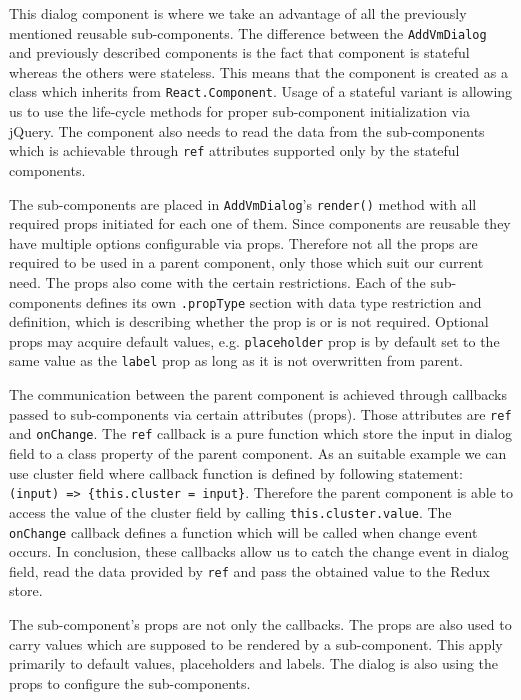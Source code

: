 This dialog component is where we take an advantage of all the previously mentioned reusable sub-components. The difference between the \texttt{AddVmDialog} and previously described components is the fact that component is stateful whereas the others were stateless. This means that the component is created as a class which inherits from \texttt{React.Component}. Usage of a stateful variant is allowing us to use the life-cycle methods for proper sub-component initialization via jQuery. The component also needs to read the data from the sub-components which is achievable through \texttt{ref} attributes supported only by the stateful components.

The sub-components are placed in \texttt{AddVmDialog}'s \texttt{render()} method with all required props initiated for each one of them. Since components are reusable they have multiple options configurable via props. Therefore not all the props are required to be used in a parent component, only those which suit our current need. The props also come with the certain restrictions. Each of the sub-components defines its own \texttt{.propType} section with data type restriction and definition, which is describing whether the prop is or is not required. Optional props may acquire default values, e.g. \texttt{placeholder} prop is by default set to the same value as the \texttt{label} prop as long as it is not overwritten from parent.

The communication between the parent component is achieved through callbacks passed to sub-components via certain attributes (props). Those attributes are \texttt{ref} and \texttt{onChange}. The \texttt{ref} callback is a pure function which store the input in dialog field to a class property of the parent component. As an suitable example we can use cluster field where callback function is defined by following statement: \texttt{(input) => \{this.cluster = input\}}. Therefore the parent component is able to access the value of the cluster field by calling \texttt{this.cluster.value}. The \texttt{onChange} callback defines a function which will be called when change event occurs. In conclusion, these callbacks allow us to catch the change event in dialog field, read the data provided by \texttt{ref} and pass the obtained value to the Redux store.

The sub-component's props are not only the callbacks. The props are also used to carry values which are supposed to be rendered by a sub-component. This apply primarily to default values, placeholders and labels. The dialog is also using the props to configure the sub-components. 

